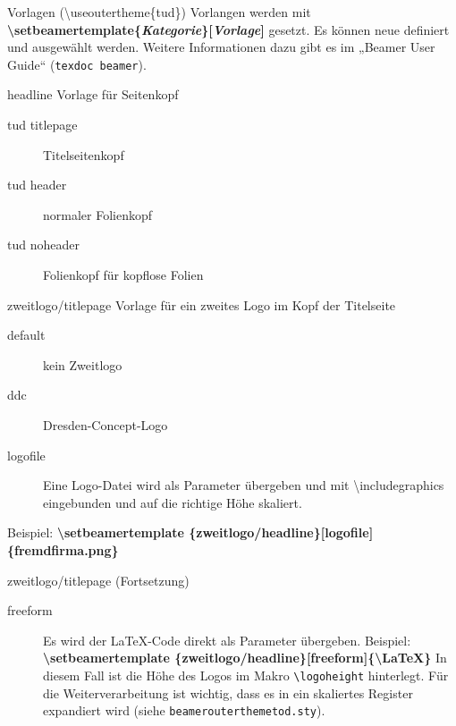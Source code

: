 \documentclass[presentation,t]{beamer}
\begin{document}
\begin{frame}[allowframebreaks]{Vorlagen (\textbackslash useoutertheme\{tud\})}
Vorlangen werden mit 
\textbf{\textbackslash setbeamertemplate\{\emph{Kategorie}\}[\emph{Vorlage}]}
gesetzt. Es können neue
definiert und ausgewählt werden. Weitere Informationen dazu gibt es im
„Beamer User Guide“ (\texttt{texdoc beamer}).
\begin{block}{headline}
Vorlage für Seitenkopf
\begin{description}
\item[{tud titlepage}] Titelseitenkopf
\item[{tud header}] normaler Folienkopf
\item[{tud noheader}] Folienkopf für kopflose Folien
\end{description}
\end{block}

\begin{block}{zweitlogo/titlepage}
Vorlage für ein zweites Logo im Kopf der Titelseite
\begin{description}
\item[{default}] kein Zweitlogo
\item[{ddc}] Dresden-Concept-Logo
\item[{logofile}] Eine Logo-Datei wird als Parameter übergeben und mit
\textbackslash includegraphics eingebunden und auf die
richtige Höhe skaliert.
\end{description}
Beispiel: 
\textbf{\textbackslash \mbox{setbeamertemplate} \{zweitlogo/headline\}[logofile]\{fremdfirma.png\}}
\end{block}
\begin{block}{zweitlogo/titlepage (Fortsetzung)}
\begin{description}
\item[{freeform}] Es wird der \LaTeX -Code direkt als Parameter übergeben. Beispiel:
\textbf{\textbackslash \mbox{setbeamertemplate} \{zweitlogo/headline\}[freeform]\{\textbackslash LaTeX\}}
In diesem Fall ist die Höhe des Logos im Makro
\texttt{\textbackslash logoheight} hinterlegt. Für die
Weiterverarbeitung ist wichtig, dass es in ein
skaliertes Register expandiert wird (siehe
\texttt{beamerouterthemetod.sty}).
\end{description}
\end{block}


\end{frame}
\end{document}
